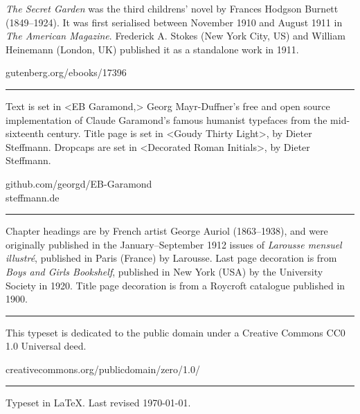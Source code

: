 \documentclass[
a5paper,
]{scrbook}
\begin{document}
\centering
\begin{minipage}{\textwidth}
\textit{The Secret Garden} was the third childrens' novel by Frances Hodgson Burnett (1849--1924). It was first serialised between November 1910 and August 1911 in \textit{The American Magazine}. Frederick A. Stokes (New York City, US) and William Heinemann (London, UK) published it as a standalone work in 1911.
\end{minipage}
\vfill
gutenberg.org/ebooks/17396
\vfill
\rule{0.5\textwidth}{.4pt}
\vfill
\begin{minipage}{\textwidth}
Text is set in <EB Garamond,> Georg Mayr-Duffner's free and open source implementation of Claude Garamond’s famous humanist typefaces from the mid-sixteenth century. Title page is set in <Goudy Thirty Light>, by Dieter Steffmann. Dropcaps are set in <Decorated Roman Initials>, by Dieter Steffmann.
\end{minipage}
\vfill
github.com/georgd/EB-Garamond\\
steffmann.de\\
\vfill
\rule{0.5\textwidth}{.4pt}
\vfill
\begin{minipage}{\textwidth}
Chapter headings are by French artist George Auriol (1863--1938), and were originally published in the January--September 1912 issues of \textit{Larousse mensuel illustré}, published in Paris (France) by Larousse. Last page decoration is from \textit{Boys and Girls Bookshelf}, published in New York (USA) by the University Society in 1920. Title page decoration is from a Roycroft catalogue published in 1900.
\end{minipage}

\vfill
\rule{0.5\textwidth}{.4pt}
\vfill

\begin{minipage}{\textwidth}
This typeset is dedicated to the public domain under a Creative Commons CC0 1.0 Universal deed.\end{minipage}
\vfill
creativecommons.org/publicdomain/zero/1.0/
\vfill
\rule{0.5\textwidth}{.4pt}
\vfill

Typeset in \LaTeX{}. Last revised \today.
\thispagestyle{empty}
\end{document}
